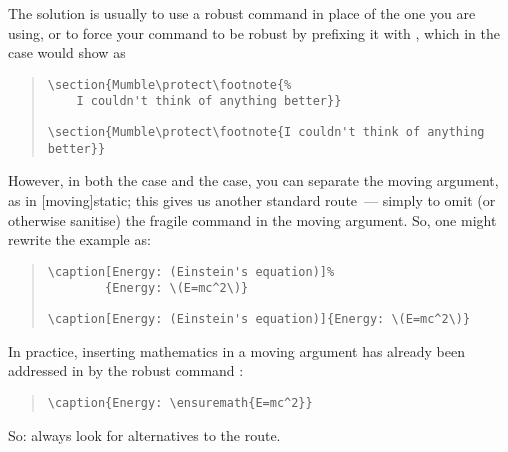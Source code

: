 The solution is usually to use a robust command in place of the one
you are using, or to force your command to be robust by prefixing it
with , which in the  case would show as
\begin{quote}
\begin{narrowversion}
\begin{verbatim}
\section{Mumble\protect\footnote{%
    I couldn't think of anything better}}
\end{verbatim}
\end{narrowversion}
\begin{wideversion}
\begin{verbatim}
\section{Mumble\protect\footnote{I couldn't think of anything better}}
\end{verbatim}
\end{wideversion}
\end{quote}
However, in both the  case and the  case,
you can separate the moving argument, as in
[moving]{static}; this gives us another standard
route~--- simply to omit (or otherwise sanitise) the fragile command
in the moving argument.  So, one might rewrite the 
example as:
\begin{quote}
\begin{narrowversion}
\begin{verbatim}
\caption[Energy: (Einstein's equation)]%
        {Energy: \(E=mc^2\)}
\end{verbatim}
\end{narrowversion}
\begin{wideversion}
\begin{verbatim}
\caption[Energy: (Einstein's equation)]{Energy: \(E=mc^2\)}
\end{verbatim}
\end{wideversion}
\end{quote}
In practice, inserting mathematics in a moving argument has already
been addressed in \latexe{} by the robust command :
\begin{quote}
\begin{verbatim}
\caption{Energy: \ensuremath{E=mc^2}}
\end{verbatim}
\end{quote}
So: always look for alternatives to the  route.

